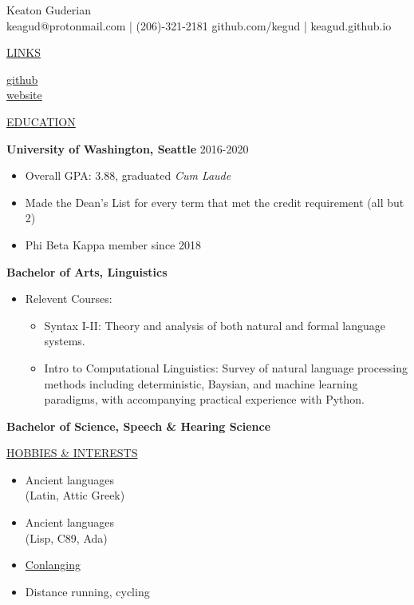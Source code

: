 \documentclass[11pt]{article}
\newcommand{\resumetitle}[3]{
    \AddToShipoutPictureBG{
        \AtPageUpperLeft {
        \raisebox{-0.09\paperheight}{
            \color{black!85}\rule{2\paperwidth}{\paperheight}}
        }}
    \begin{Center}
        \begingroup
        \titlethin
        \color{black!10}\Huge{#1}
        \titlethick
        \color{black!5}\Huge{#2} \\
        \vspace{2mm}
        \textrm{\color{black!15}\Large{#3}}
        \endgroup
    \end{Center}
    \vspace{7mm}
}
\newcommand{\betteruline}[1]{
    \uline{#1}
}
\newcommand{\sectiontitle}[1]{
    \begingroup
        \titlebold
        \betteruline{\Large\uppercase{#1}  }
        \vspace{1.7mm}
    \endgroup
}
\newcommand{\sectioncontent}[1]{
    \begingroup
        \begin{FlushLeft}
        \vspace{-3mm}
        \sffamily\small#1
        \end{FlushLeft}
    \endgroup
    \vspace{2mm}
}
\begin{document}
    \resumetitle{Keaton}{Guderian} {
      keagud@protonmail.com | (206)-321-2181
      github.com/kegud | keagud.github.io
    }

    \setlength{\columnsep}{7mm}
    \begin{paracol}{2}

    \sectiontitle{links}
    \sectioncontent{
        \hspace{2mm}
        \href{https://github.com/keagud}{github} \\
        \faIcon{link}\hspace{1.8mm}
        \href{keagud.github.io}{website}
    }

    \sectiontitle{education}
    \sectioncontent{
        \begingroup
      \textbf{University of Washington, Seattle }\hfill\color{black!70}\small{2016-2020}
        \endgroup
      \begin{itemize}
      \item Overall GPA: 3.88, graduated \textit{Cum Laude}
      \item Made the Dean's List for every term that met the credit requirement (all but 2)
      \item Phi Beta Kappa member since 2018
        \end{itemize}
      \item \textbf{Bachelor of Arts, Linguistics }
        \begin{itemize}
          \item Relevent Courses: 
            \begin{itemize}
              \item Syntax I-II: Theory and analysis of both natural and formal language systems.
              \item Intro to Computational Linguistics: Survey of natural language processing methods including deterministic, Baysian, and machine learning paradigms, with accompanying practical experience with Python.
            \end{itemize}

        \end{itemize}
      \item \textbf{Bachelor of Science, Speech \& Hearing Science}
      } 

    \sectiontitle{Hobbies \& Interests}
    \sectioncontent{
      \begin{itemize}
        \item Ancient languages \\ (Latin, Attic Greek)
        \item Ancient languages \\  (Lisp, C89, Ada)
        \item \href{https://en.wikipedia.org/wiki/Constructed\_language}{Conlanging}
        \item Distance running, cycling


\end{itemize}}
\end{paracol}
\end{document}
